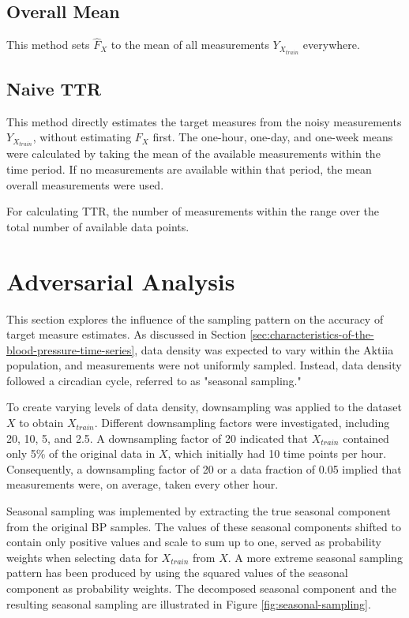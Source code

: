 \subsection{Overall Mean}
This method sets $\hat{F}_X$ to the mean of all measurements
$Y_{X_{train}}$ everywhere.


\subsection{Naive TTR}
This method directly estimates the target measures
from the noisy measurements $Y_{X_{train}}$, without estimating $F_X$
first.
The one-hour, one-day, and one-week means were calculated by
taking the mean of the available measurements within the time period.
If no measurements are available within that period, the mean
overall measurements were used.

For calculating TTR, the number of measurements within the range over
the total number of available data points.


\section{Adversarial Analysis}\label{sec:adversarial-analysis}

This section explores the influence of the sampling pattern on the accuracy of
target measure estimates.
As discussed in Section \ref{sec:characteristics-of-the-blood-pressure-time-series},
data density was expected to vary within the Aktiia population,
and measurements were not uniformly sampled.
Instead, data density followed a circadian cycle, referred to as "seasonal sampling."

To create varying levels of data density, downsampling was applied to the dataset
$X$ to obtain $X_{train}$.
Different downsampling factors were investigated, including 20, 10, 5, and 2.5.
A downsampling factor of 20 indicated that $X_{train}$ contained only
5\% of the original data in $X$, which initially had 10 time points per hour.
Consequently, a downsampling factor of 20 or a data fraction of 0.05 implied
that measurements were, on average, taken every other hour.

Seasonal sampling was implemented by extracting the true seasonal component
from the original BP samples. The values of these seasonal components
shifted to contain only positive values and scale to sum up to one,
served as probability weights when selecting data for $X_{train}$ from $X$.
A more extreme seasonal sampling pattern has been produced by
using the squared values of the seasonal component as probability weights.
The decomposed seasonal component and the resulting seasonal sampling are
illustrated in Figure \ref{fig:seasonal-sampling}.




